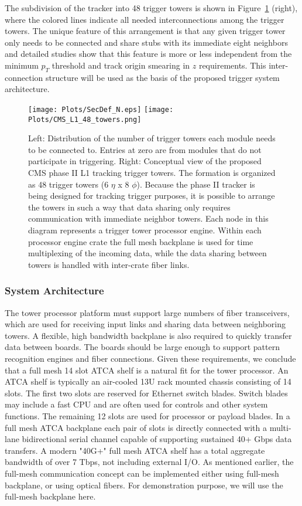 \noindent The subdivision of the tracker into 48 trigger towers is shown in Figure~\ref{fig:TT_config} (right), where the colored lines indicate all needed interconnections among the trigger towers. The unique feature of this arrangement is that any given trigger tower only needs to be connected and share stubs with its immediate eight neighbors and detailed studies show that this feature is more or less independent from the minimum $p_T$ threshold and track origin smearing in $z$ requirements. This inter-connection structure will be used as the basis of the proposed trigger system architecture. 

\begin{figure}[ht!]
\centering
\texttt{[image: Plots/SecDef\_N.eps]}
\texttt{[image: Plots/CMS\_L1\_48\_towers.png]}
\caption{
Left: Distribution of the number of trigger towers each module needs to be connected to. Entries at zero are from modules that do not participate in triggering.
Right: Conceptual view of the proposed CMS phase II L1 tracking trigger towers.  The formation is organized as 48 trigger towers (6 $\eta$ x 8 $\phi$).  Because the phase II tracker is being designed for tracking trigger purposes, it is possible to arrange the towers in such a way that data sharing only requires communication with immediate neighbor towers.  Each node in this diagram represents a trigger tower processor engine.  Within each processor engine crate the full mesh backplane is used for time multiplexing of the incoming data, while the data sharing between towers is handled with inter-crate fiber links.}
\label{fig:TT_config}
\end{figure}



\subsubsection{System Architecture}

\noindent The tower processor platform must support large numbers of fiber transceivers, which are used for receiving input links and sharing data between neighboring towers.  A flexible, high bandwidth backplane is also required to quickly transfer data between boards.  The boards should be large enough to support pattern recognition engines and fiber connections. Given these requirements, we conclude that a full mesh 14 slot ATCA shelf is a natural fit for the tower processor. An ATCA shelf is typically an air-cooled 13U rack mounted chassis consisting of 14 slots.  The first two slots are reserved for Ethernet switch blades.  Switch blades may include a fast CPU and are often used for controls and other system functions.  The remaining 12 slots are used for processor or payload blades.  In a full mesh ATCA backplane each pair of slots is directly connected with a multi-lane bidirectional serial channel capable of supporting sustained 40+ Gbps data transfers.  A modern "40G+" full mesh ATCA shelf has a total aggregate bandwidth of over 7 Tbps, not including external I/O. As mentioned earlier, the full-mesh communication concept can be implemented either using full-mesh backplane, or using optical fibers. For  demonstration purpose, we will use the full-mesh backplane here. 

